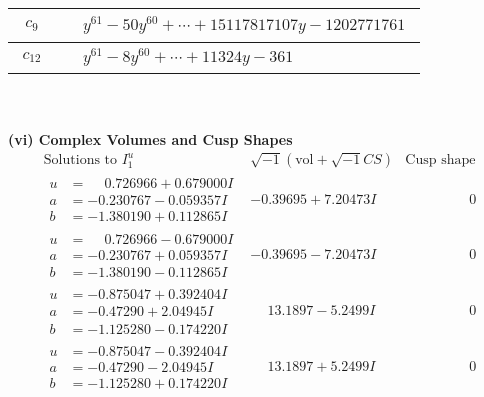 \documentclass[1p]{elsarticle_modified}
\theoremstyle{definition}
\newcommand{\I}{\sqrt{-1}}
\begin{document}
\begin{tabular}{m{50pt}|m{274pt}}
\hline $$\begin{aligned}c_{9}\end{aligned}$$&$\begin{aligned}
&y^{61}-50 y^{60}+\cdots+15117817107 y-1202771761
\end{aligned}$\\
\hline $$\begin{aligned}c_{12}\end{aligned}$$&$\begin{aligned}
&y^{61}-8 y^{60}+\cdots+11324 y-361
\end{aligned}$\\
\hline
\end{tabular}\\~\\
\newpage\flushleft \textbf{(vi) Complex Volumes and Cusp Shapes}
$$\begin{array}{c|c|c}  
\text{Solutions to }I^u_{1}& \I (\text{vol} + \sqrt{-1}CS) & \text{Cusp shape}\\
 \hline 
\begin{aligned}
u &= \phantom{-}0.726966 + 0.679000 I \\
a &= -0.230767 - 0.059357 I \\
b &= -1.380190 + 0.112865 I\end{aligned}
 & -0.39695 + 7.20473 I & \phantom{-0.000000 } 0 \\ \hline\begin{aligned}
u &= \phantom{-}0.726966 - 0.679000 I \\
a &= -0.230767 + 0.059357 I \\
b &= -1.380190 - 0.112865 I\end{aligned}
 & -0.39695 - 7.20473 I & \phantom{-0.000000 } 0 \\ \hline\begin{aligned}
u &= -0.875047 + 0.392404 I \\
a &= -0.47290 + 2.04945 I \\
b &= -1.125280 - 0.174220 I\end{aligned}
 & \phantom{-}13.1897 - 5.2499 I & \phantom{-0.000000 } 0 \\ \hline\begin{aligned}
u &= -0.875047 - 0.392404 I \\
a &= -0.47290 - 2.04945 I \\
b &= -1.125280 + 0.174220 I\end{aligned}
 & \phantom{-}13.1897 + 5.2499 I & \phantom{-0.000000 } 0 \\ \hline\begin{aligned}

\end{aligned}
\end{array}$$
\end{document}
